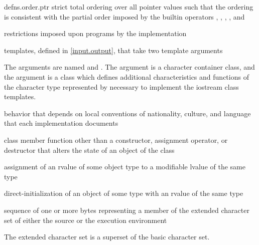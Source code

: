 {defns.order.ptr}
%
strict total ordering over all pointer values
such that the ordering is consistent with the partial order
imposed by the builtin operators
\tcode{<}, \tcode{>}, \tcode{<=}, \tcode{>=}, and \tcode{<=>}

%
restrictions imposed upon programs by the implementation

templates, defined in \ref{input.output},
that take two template arguments

\begin{defnote}
The arguments are named  and .
The argument  is a character container class, and
the argument  is a class
which defines additional characteristics and functions
of the character type represented by 
necessary to implement the iostream class templates.
\end{defnote}

%
behavior that depends on local conventions of nationality, culture, and
language that each implementation documents

%
class member function other than a constructor,
assignment operator, or destructor
that alters the state of an object of the class

%
assignment of an rvalue of some object type to a modifiable lvalue of the same type

%
direct-initialization of an object of some type with an rvalue of the same type

%
sequence of one or more bytes representing a member of the extended
character set of either the source or the execution environment

\begin{defnote}
The extended character set is a superset of the basic character
set.
\end{defnote}

